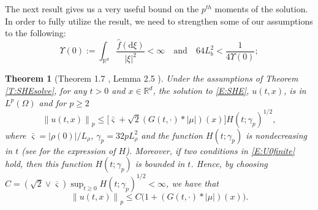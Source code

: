 \documentclass[12pt]{report}
\theoremstyle{plain}
\newtheorem{theorem}{Theorem}[section]
\theoremstyle{definition}
\numberwithin{equation}{section}
\newcommand{\R}{\mathbb{R}}
\newcommand{\Norm}[1]{\left\|  #1   \right\|}
\newcommand{\ud}{\ensuremath{ \mathrm{d} }}
\begin{document}
The next result gives us a very useful bound on the $p^{th}$ moments of the solution. In order to fully utilize the result, we need to strengthen some of our assumptions to the following:
	\begin{equation} \label{E:U0finite}
	\Upsilon(0) := \int_{\R^d} \frac{\hat{f}(\ud \xi)}{|\xi|^2} <\infty \quad \text{and} \quad
	64L^2_{b}   <  \frac{1}{4\Upsilon(0)};
	\end{equation}


\begin{theorem}[Theorem 1.7 \cite{chen.huang:19:comparison}, Lemma 2.5 \cite{chen.kim:19:nonlinear}] \label{T:ExUn}
	Under the assumptions of Theorem \ref{T:SHEsolve}, for any $t>0$ and $x \in \R^d$, the solution to
	\eqref{E:SHE}, $u(t,x)$, is in $L^p(\Omega)$ and for $p\ge 2$
	\begin{equation} \label{E:mb}
	\Norm{u(t,x)}_p \le \big[\bar{\varsigma}+\sqrt{2}(G(t,\cdot) * |\mu|)(x)\big]H(t;\gamma_p)^{1/2},
	\end{equation}
	where $\bar{\varsigma}=|\rho(0)|/L_{\rho}$, $\gamma_p = 32pL_{\rho}^2$ and the function $H(t;\gamma_p)$ is nondecreasing in $t$ (see \cite{chen.huang:19:comparison} for the expression of $H$). Moreover, if two conditions in \eqref{E:U0finite} hold,
	then this function $H(t;\gamma_p)$ is bounded in $t$. Hence, by choosing $C=\left(\sqrt{2}\vee
	\overline{\varsigma}\right)\sup_{t\ge 0} H(t;\gamma_p)^{1/2}<\infty$, we have that
	\begin{equation} 
	\Norm{u(t,x)}_p \le C\bigg(1+ (G(t, \cdot)*|\mu|)(x) \bigg).
	\end{equation}
\end{theorem}
\end{document}
